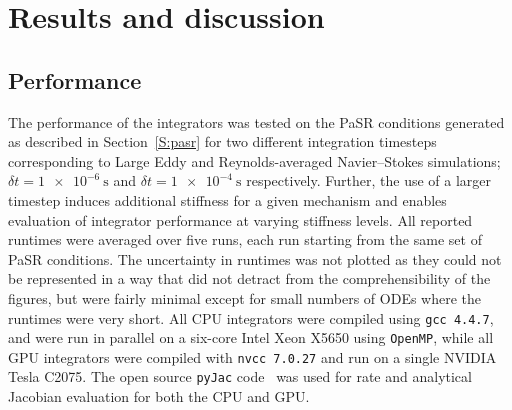 \documentclass[preprint]{elsarticle}
\begin{document}
\section{Results and discussion}

\subsection{Performance}

The performance of the integrators was tested on the PaSR conditions generated as described in Section~\ref{S:pasr} for two different integration timesteps corresponding to Large Eddy and Reynolds-averaged Navier--Stokes simulations; $\delta t = \SI{1e-6}{\s}$ and $\delta t = \SI{1e-4}{\s}$ respectively.
Further, the use of a larger timestep induces additional stiffness for a given mechanism and enables evaluation of integrator performance at varying stiffness levels.
All reported runtimes were averaged over five runs, each run starting from the same set of PaSR conditions.
The uncertainty in runtimes was not plotted as they could not be represented in a way that did not detract from the comprehensibility of the figures, but were fairly minimal except for small numbers of ODEs where the runtimes were very short.
All CPU integrators were compiled using \texttt{gcc 4.4.7}, and were run in parallel on a six-core Intel Xeon X5650 using \texttt{OpenMP}, while all GPU integrators were compiled with \texttt{nvcc 7.0.27} and run on a single NVIDIA Tesla C2075.
The open source \texttt{pyJac} code~\cite{Niemeyer:2015im,Niemeyer:2015ws} was used for rate and analytical Jacobian evaluation for both the CPU and GPU.
\end{document}
